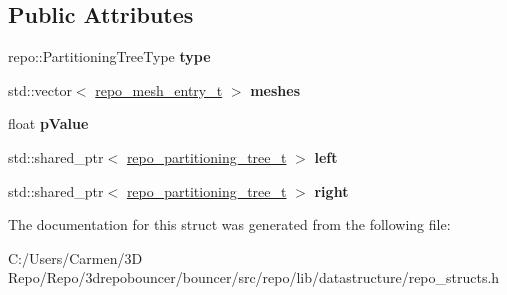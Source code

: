 \subsection*{Public Attributes}
\begin{DoxyCompactItemize}
\item 
\hypertarget{structrepo__partitioning__tree__t_a50608492dd6a19de604e49791b1ce205}{}repo\+::\+Partitioning\+Tree\+Type {\bfseries type}\label{structrepo__partitioning__tree__t_a50608492dd6a19de604e49791b1ce205}

\item 
\hypertarget{structrepo__partitioning__tree__t_a2297db3056b0c3f86af98eb7fd03b553}{}std\+::vector$<$ \hyperlink{structrepo__mesh__entry__t}{repo\+\_\+mesh\+\_\+entry\+\_\+t} $>$ {\bfseries meshes}\label{structrepo__partitioning__tree__t_a2297db3056b0c3f86af98eb7fd03b553}

\item 
\hypertarget{structrepo__partitioning__tree__t_ae528381e051e7845e018601206f1fb84}{}float {\bfseries p\+Value}\label{structrepo__partitioning__tree__t_ae528381e051e7845e018601206f1fb84}

\item 
\hypertarget{structrepo__partitioning__tree__t_aeefc3aa701a5dc08fb95cfeedc19c2e3}{}std\+::shared\+\_\+ptr$<$ \hyperlink{structrepo__partitioning__tree__t}{repo\+\_\+partitioning\+\_\+tree\+\_\+t} $>$ {\bfseries left}\label{structrepo__partitioning__tree__t_aeefc3aa701a5dc08fb95cfeedc19c2e3}

\item 
\hypertarget{structrepo__partitioning__tree__t_a2d619be91780ace2a48b98b0bc22d390}{}std\+::shared\+\_\+ptr$<$ \hyperlink{structrepo__partitioning__tree__t}{repo\+\_\+partitioning\+\_\+tree\+\_\+t} $>$ {\bfseries right}\label{structrepo__partitioning__tree__t_a2d619be91780ace2a48b98b0bc22d390}

\end{DoxyCompactItemize}


The documentation for this struct was generated from the following file\+:\begin{DoxyCompactItemize}
\item 
C\+:/\+Users/\+Carmen/3\+D Repo/\+Repo/3drepobouncer/bouncer/src/repo/lib/datastructure/repo\+\_\+structs.\+h\end{DoxyCompactItemize}

